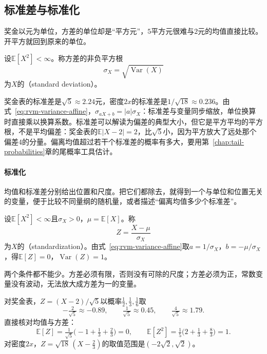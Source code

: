 \subsection{标准差与标准化}
\label{sec:rvm-standardization}

奖金以元为单位，方差的单位却是“平方元”，$5$平方元很难与$2$元的均值直接比较。开平方就回到原来的单位。

\begin{definition}[标准差]
\label{def:rvm-std}
设$\mathbb{E}[X^{2}]<\infty$。称方差的非负平方根
\begin{equation}
 \sigma_X=\sqrt{\operatorname{Var}(X)}
 \label{eq:rvm-std}
\end{equation}
为$X$的（standard deviation）。
\end{definition}

奖金表的标准差是$\sqrt5\approx2.24$元，密度$2x$的标准差是$1/\sqrt{18}\approx0.236$。由式~\eqref{eq:rvm-variance-affine}，$\sigma_{aX+b}=\lvert a\rvert\sigma_X$：标准差与变量同步缩放，单位换算时直接乘以换算系数。标准差可以解读为偏差的典型大小，但它是平方平均的平方根，不是平均偏差：奖金表的$\mathbb{E}\lvert X-2\rvert=2$，比$\sqrt5$小，因为平方放大了远处那个偏差$4$的分量。偏离均值超过若干个标准差的概率有多大，要用第~\ref{chap:tail-probabilities}章的尾概率工具估计。

\paragraph{标准化}
均值和标准差分别给出位置和尺度。把它们都除去，就得到一个与单位和位置无关的变量，便于比较不同量纲的随机量，或者描述“偏离均值多少个标准差”。

\begin{definition}[标准化]
\label{def:rvm-standardize}
设$\mathbb{E}[X^{2}]<\infty$且$\sigma_X>0$，$\mu=\mathbb{E}[X]$。称
\begin{equation}
 Z=\frac{X-\mu}{\sigma_X}
 \label{eq:rvm-standardize}
\end{equation}
为$X$的（standardization）。由式~\eqref{eq:rvm-variance-affine}取$a=1/\sigma_X$，$b=-\mu/\sigma_X$，得$\mathbb{E}[Z]=0$，$\operatorname{Var}(Z)=1$。
\end{definition}

两个条件都不能少。方差必须有限，否则没有可除的尺度；方差必须为正，常数变量没有波动，无法放大成方差为一的变量。

对奖金表，$Z=(X-2)/\sqrt5$以概率$\tfrac12,\tfrac13,\tfrac16$取
\[
 -\tfrac{2}{\sqrt5}\approx-0.89,\qquad \tfrac{1}{\sqrt5}\approx0.45,\qquad \tfrac{4}{\sqrt5}\approx1.79 .
\]
直接核对均值与方差：
\[
 \mathbb{E}[Z]=\tfrac{1}{\sqrt5}\bigl(-1+\tfrac13+\tfrac23\bigr)=0,\qquad
 \mathbb{E}[Z^{2}]=\tfrac15\bigl(2+\tfrac13+\tfrac83\bigr)=1 .
\]对密度$2x$，$Z=\sqrt{18}\,(X-\tfrac23)$的取值范围是$(-2\sqrt2,\sqrt2)$。

